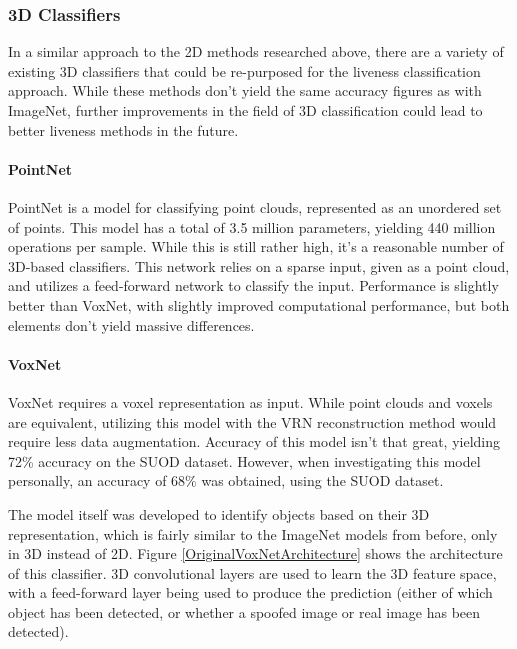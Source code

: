 \documentclass[12pt,a4paper]{article}
\begin{document}
        \subsubsection{3D Classifiers}
            

            In a similar approach to the 2D methods researched above, there are a variety of existing 3D classifiers that could be re-purposed for the liveness classification approach.
            While these methods don't yield the same accuracy figures as with ImageNet, further improvements in the field of 3D classification could lead to better liveness methods in the future.
         
            \paragraph{PointNet}
            PointNet is a model for classifying point clouds, represented as an unordered set of points. This model has a total of 3.5 million parameters, yielding 440 million operations per sample. 
            While this is still rather high, it's a reasonable number of 3D-based classifiers. This network relies on a sparse input, given as a point cloud, and utilizes a feed-forward network to classify the input.
            Performance is slightly better than VoxNet, with slightly improved computational performance, but both elements don't yield massive differences. \cite{PointNet}
            
           
            \paragraph{VoxNet}
            
            VoxNet requires a voxel representation as input. While point clouds and voxels are equivalent, utilizing this model with the VRN reconstruction method would require less data augmentation. Accuracy of this model isn't that great, yielding 72\% accuracy on the SUOD dataset. \cite{VoxNetModel} However, when investigating this model personally, an accuracy of 68\% was obtained, using the SUOD dataset. 

            The model itself was developed to identify objects based on their 3D representation, which is fairly similar to the ImageNet models from before, only in 3D instead of 2D. 
            Figure \ref{OriginalVoxNetArchitecture} shows the architecture of this classifier. 3D convolutional layers are used to learn the 3D feature space, with a feed-forward layer
            being used to produce the prediction (either of which object has been detected, or whether a spoofed image or real image has been detected).
\end{document}
